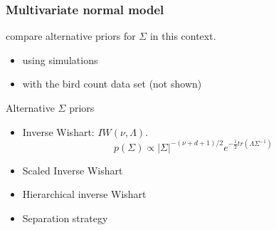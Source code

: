 \documentclass[9pt]{beamer}\usepackage[]{graphicx}\usepackage[]{color}
\begin{document}
\begin{frame}
\frametitle{Multivariate normal model }

\cite{Alvarez2014} compare alternative priors for $\Sigma$ in this context.
\begin{itemize}
\item using simulations
\item with the bird count data set (not shown)
\end{itemize}

Alternative $\Sigma$ priors
\begin{itemize}
\item Inverse Wishart: $IW(\nu, \Lambda)$.   
\[  p(\Sigma) \propto  |\Sigma|^{-(\nu+ d +1)/2 } e^{-\frac{1}{2} tr( \Lambda \Sigma^{-1}) } \]

\item Scaled Inverse Wishart 

\item Hierarchical inverse Wishart

\item Separation strategy 

\end{itemize}
\end{frame}




% 
% 
% 
% 
\end{document}
